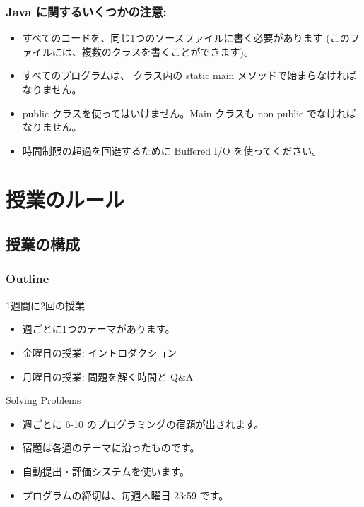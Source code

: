 \documentclass{beamer}
\begin{document}
\begin{frame}
  \frametitle{Java に関するいくつかの注意:}

  \begin{itemize}
  \item すべてのコードを、同じ1つのソースファイルに書く必要があります
    (このファイルには、複数のクラスを書くことができます)。

    \medskip

  \item すべてのプログラムは、 クラス内の static main メソッドで始まらなければなりません。

    \medskip

  \item public クラスを使ってはいけません。Main クラスも non public でなければなりません。

    \medskip

  \item 時間制限の超過を回避するために Buffered I/O を使ってください。
  \end{itemize}
\end{frame}

\section{授業のルール}
\subsection{授業の構成}

\begin{frame}
    \frametitle{Outline}
    
    \begin{block}{1週間に2回の授業}
        \begin{itemize}   
        \item 週ごとに1つのテーマがあります。
        \item 金曜日の授業: イントロダクション
        \item 月曜日の授業: 問題を解く時間と Q\&A
        \end{itemize}
    \end{block}
    
    \begin{block}{Solving Problems}
        \begin{itemize}
        \item 週ごとに 6-10 のプログラミングの宿題が出されます。
        \item 宿題は各週のテーマに沿ったものです。
        \item 自動提出・評価システムを使います。
        \item プログラムの締切は、毎週木曜日 23:59 です。
        \end{itemize}
    \end{block}
\end{frame}
    
\end{document}

